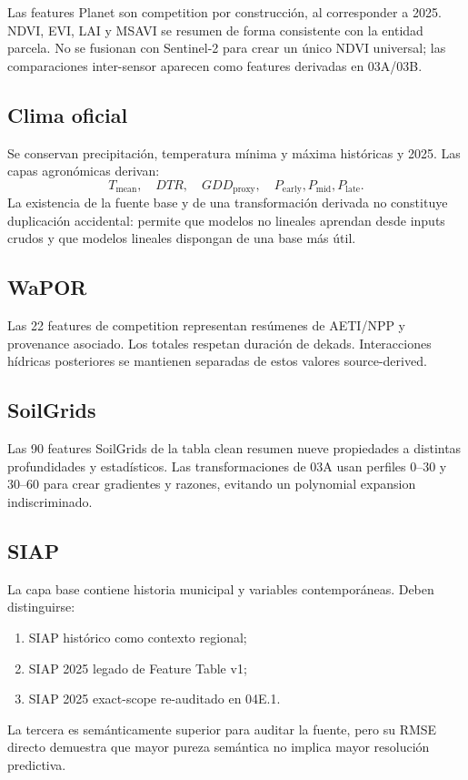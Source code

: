 Las features Planet son competition por construcción, al corresponder a 2025. NDVI, EVI, LAI
y MSAVI se resumen de forma consistente con la entidad parcela. No se fusionan con Sentinel-2
para crear un único NDVI universal; las comparaciones inter-sensor aparecen como features
derivadas en 03A/03B.

\subsection{Clima oficial}

Se conservan precipitación, temperatura mínima y máxima históricas y 2025. Las capas
agronómicas derivan:
\[
T_{\mathrm{mean}},\quad DTR,\quad GDD_{\mathrm{proxy}},
\quad P_{\mathrm{early}},P_{\mathrm{mid}},P_{\mathrm{late}}.
\]
La existencia de la fuente base y de una transformación derivada no constituye duplicación
accidental: permite que modelos no lineales aprendan desde inputs crudos y que modelos
lineales dispongan de una base más útil.

\subsection{WaPOR}

Las 22 features de competition representan resúmenes de AETI/NPP y provenance asociado. Los
totales respetan duración de dekads. Interacciones hídricas posteriores se mantienen separadas
de estos valores source-derived.

\subsection{SoilGrids}

Las 90 features SoilGrids de la tabla clean resumen nueve propiedades a distintas
profundidades y estadísticos. Las transformaciones de 03A usan perfiles 0--30 y 30--60 para
crear gradientes y razones, evitando un polynomial expansion indiscriminado.

\subsection{SIAP}

La capa base contiene historia municipal y variables contemporáneas. Deben distinguirse:
\begin{enumerate}
\item SIAP histórico como contexto regional;
\item SIAP 2025 legado de Feature Table v1;
\item SIAP 2025 exact-scope re-auditado en 04E.1.
\end{enumerate}
La tercera es semánticamente superior para auditar la fuente, pero su RMSE directo demuestra
que mayor pureza semántica no implica mayor resolución predictiva.

